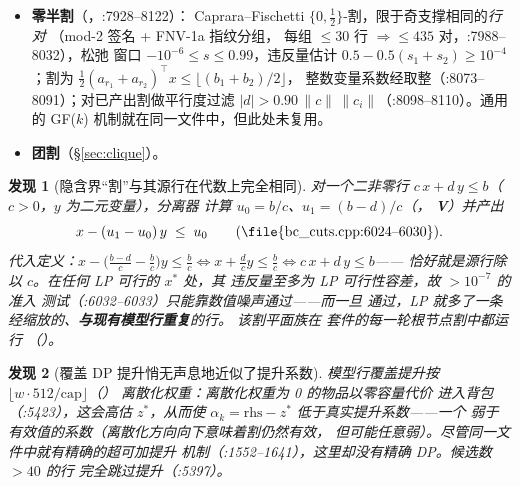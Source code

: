 \documentclass[11pt]{ctexart}
\newtheorem{finding}{发现}
\begin{document}
\begin{itemize}[nosep]
  $|\cos|>0.90$ 平行度过滤器（:5636--5643）；行变体\emph{完全没有}过滤
  （:6156--6170）。
\item \textbf{零半割}（，:7928--8122）：
  Caprara--Fischetti $\{0,\tfrac12\}$-割，限于奇支撑相同的\emph{行对}
  （mod-2 签名 + FNV-1a 指纹分组，
  每组 $\le 30$ 行 $\Rightarrow \le 435$ 对，:7988--8032），松弛
  窗口 $-10^{-6} \le s \le 0.99$，违反量估计
  $0.5 - 0.5(s_1+s_2) \ge 10^{-4}$；割为
  $\tfrac{1}{2}(a_{r_1}{+}a_{r_2})^\top x \le \lfloor (b_1{+}b_2)/2\rfloor$，
  整数变量系数经取整（:8073--8091）；对已产出割做平行度过滤
  $|d| > 0.90\,\|c\|\,\|c_i\|$（:8098--8110）。通用的 GF($k$)
  机制就在同一文件中，但此处未复用。
\item \textbf{团割}（\S\ref{sec:clique}）。
\end{itemize}

\begin{finding}[隐含界“割”与其源行在代数上完全相同]
\label{find:implied-bound}
对一个二非零行 $c\,x + d\,y \le b$（$c>0$，$y$ 为二元变量），分离器
计算 $u_0 = b/c$、$u_1 = (b-d)/c$（，
\textbf{V}）并产出
\begin{equation}
x - (u_1 - u_0)\,y \;\le\; u_0
\qquad (\text{\file{bc\_cuts.cpp:6024--6030}}).
\label{eq:implied-bound-cut}
\end{equation}
代入定义：$x - \big(\frac{b-d}{c} - \frac{b}{c}\big) y \le
\frac{b}{c} \iff x + \frac{d}{c} y \le \frac{b}{c} \iff c\,x + d\,y \le b$——
\emph{恰好就是源行除以 $c$}。在任何 LP 可行的 $x^*$ 处，其
违反量至多为 LP 可行性容差，故 $>10^{-7}$ 的准入
测试（:6032--6033）只能靠数值噪声通过——而一旦
通过，LP 就多了一条经缩放的、\textbf{与现有模型行重复}的行。
该割平面族在  套件的每一轮根节点割中都运行
（）。
\end{finding}

\begin{finding}[覆盖 DP 提升悄无声息地近似了提升系数]
\label{find:cover-dp}
模型行覆盖提升按
$\lfloor w \cdot 512 / \mathrm{cap} \rfloor$（）
离散化权重：离散化权重为 0 的物品以\emph{零容量代价}
进入背包（:5423），这会高估 $z^*$，从而使
$\alpha_k = \mathrm{rhs} - z^*$ 低于真实提升系数——一个
弱于有效值的系数（离散化方向向下意味着割仍然有效，
但可能任意弱）。尽管同一文件中就有精确的超可加提升
机制（:1552--1641），这里却没有精确 DP。候选数 $>40$ 的行
完全跳过提升（:5397）。
\end{finding}
\end{document}
